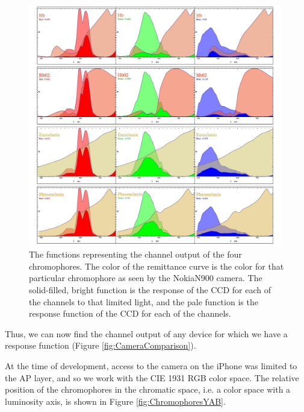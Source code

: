 \begin{figure}[h!]
  \centering
    \includegraphics[width=0.99\textwidth]{Chapter1/Figs/Chromophores_NokiaN900.jpg}
    \caption{The functions representing the channel output of the four chromophores. The color of the remittance curve is the color for that particular chromophore as seen by the NokiaN900 camera. The solid-filled, bright function is the response of the CCD for each of the channels to that limited light, and the pale function is the response function of the CCD for each of the channels.}  \label{fig:Chromophores_NokiaN900}
\end{figure}



Thus, we can now find the channel output of any device for which we have a response function (Figure \ref{fig:CameraComparison}).

At the time of development, access to the camera on the iPhone was limited to the AP layer, and so we work with the CIE 1931 RGB color space. The relative position of the chromophores in the chromatic space, i.e. a color space with a luminosity axis, is shown in Figure \ref{fig:ChromophoresYAB}.








